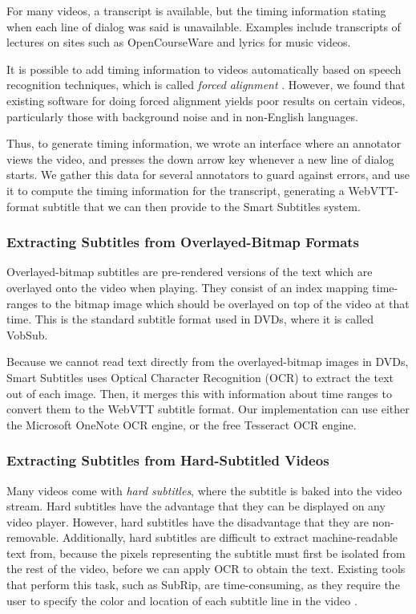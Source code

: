 \documentclass{sigchi}
\begin{document}
For many videos, a transcript is available, but the timing information
stating when each line of dialog was said is unavailable.
Examples include transcripts of lectures on sites such as
OpenCourseWare and lyrics for music videos.

It is possible to add timing information to videos automatically based on speech recognition techniques, which is called \emph{forced alignment} \cite{sailalign}.
However, we found that existing software for doing forced alignment
yields poor results on certain videos, particularly those with background
noise and in non-English languages.

Thus, to generate timing information,
we wrote an interface where an annotator
views the video, and presses the down arrow key whenever a new
line of dialog starts.
We gather this data for several annotators to guard against errors,
and use it to compute the timing information for the transcript,
generating a WebVTT-format subtitle that we can then provide to the Smart Subtitles system.

\subsubsection{Extracting Subtitles from Overlayed-Bitmap Formats}

Overlayed-bitmap subtitles are pre-rendered versions of the text which are overlayed onto the video when playing. They consist of an index mapping time-ranges to the bitmap image which should be overlayed on top of the video at that time. This is the standard subtitle format used in DVDs, where it is called VobSub.

Because we cannot read text directly from the overlayed-bitmap images in DVDs, Smart Subtitles uses Optical Character Recognition (OCR) to extract the text out of each image. Then, it merges this with information about time ranges to convert them to the WebVTT subtitle format. Our implementation can use either the Microsoft OneNote \cite{onenote} OCR engine, or the free Tesseract \cite{tesseract} OCR engine.

\subsubsection{Extracting Subtitles from Hard-Subtitled Videos}

Many videos come with \emph{hard subtitles}, where the subtitle is baked into the video stream. Hard subtitles have the advantage that they can be displayed on any video player. However, hard subtitles have the disadvantage that they are non-removable. Additionally, hard subtitles are difficult to extract machine-readable text from, because the pixels representing the subtitle must first be isolated from the rest of the video, before we can apply OCR to obtain the text. Existing tools that perform this task, such as SubRip, are time-consuming, as they require the user to specify the color and location of each subtitle line in the video \cite{subrip}.
\end{document}
